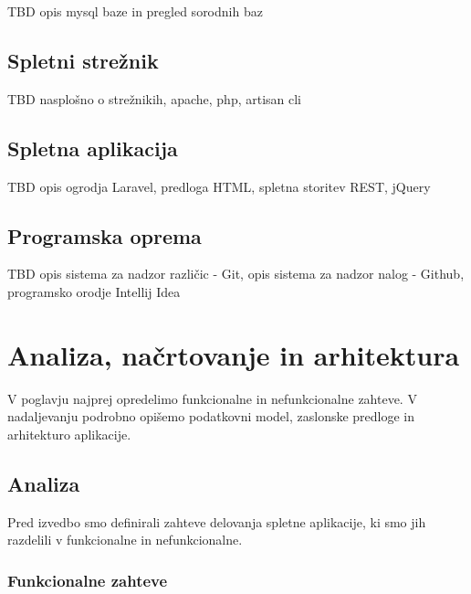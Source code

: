 \documentclass[a4paper, 12pt]{book}
\begin{document}
TBD opis mysql baze in pregled sorodnih baz

\section{Spletni strežnik}

TBD nasplošno o strežnikih, apache, php, artisan cli

\section{Spletna aplikacija}

TBD opis ogrodja Laravel, predloga HTML, spletna storitev REST, jQuery

\section{Programska oprema}

TBD opis sistema za nadzor različic - Git, opis sistema za nadzor nalog - Github, programsko orodje Intellij Idea



\chapter{Analiza, načrtovanje in arhitektura}
\label{analiza-nacrtovanje-arhitektura}

V poglavju najprej opredelimo funkcionalne in nefunkcionalne zahteve. V nadaljevanju podrobno opišemo podatkovni model, zaslonske predloge in arhitekturo aplikacije.


\section{Analiza}

Pred izvedbo smo definirali zahteve delovanja spletne aplikacije, ki smo jih razdelili v funkcionalne in nefunkcionalne.


\subsection{Funkcionalne zahteve}
\end{document}
